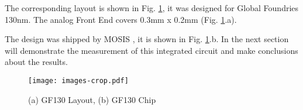 The corresponding layout is shown in Fig. \ref{fig:layout}, it was designed for Global Foundries 130nm. The analog Front End covers 0.3mm x 0.2mm (Fig. \ref{fig:layout}.a).

The design was shipped by MOSIS \cite{mosis}, it is shown in Fig. \ref{fig:layout}.b. In the next section will demonstrate the measurement of this integrated circuit and make conclusions about the results.

\begin{figure}[h]
  \centering
  \texttt{[image: images-crop.pdf]}
  \caption{(a) GF130 Layout, (b) GF130 Chip}
  \label{fig:layout}
\end{figure}